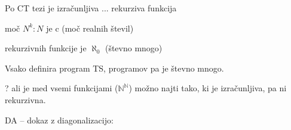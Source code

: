 \documentclass[10pt,a4paper,oneside]{book}
\begin{document}

Po CT tezi je izračunljiva ... rekurziva funkcija %
\begin{items}
\item moč $N^k:N$ je c (moč realnih števil)%
\item rekurzivnih funkcije je $\aleph_0$ (števno mnogo)
\item Vsako definira program TS, programov pa je števno mnogo.
\item ? ali je med vsemi funkcijami ($\mathbb{N}^\mathbb{N}$) možno najti tako, ki je izračunljiva, pa ni rekurzivna.
\item DA -- dokaz z diagonalizacijo:\\
\end{items}
\end{document}
